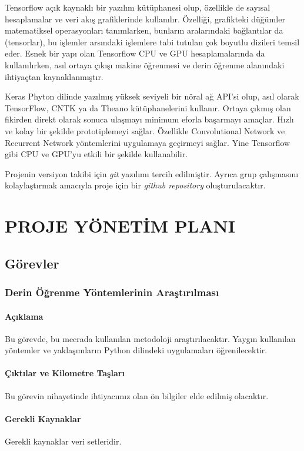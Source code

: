 \documentclass[12pt,a4paper]{article}
\begin{document}
   Tensorflow açık kaynaklı bir yazılım kütüphanesi olup, özellikle de sayısal hesaplamalar ve veri akış grafiklerinde kullanılır. Özelliği, grafikteki düğümler matematiksel operasyonları tanımlarken, bunların aralarındaki bağlantılar da (tensorlar), bu işlemler arsındaki işlemlere tabi tutulan çok boyutlu dizileri temsil eder.
   Esnek bir yapı olan Tensorflow CPU ve GPU hesaplamalarında da kullanılırken, asıl ortaya çıkışı makine öğrenmesi ve derin öğrenme alanındaki ihtiyaçtan kaynaklanmıştır. \cite{tf}

   Keras Phyton dilinde yazılmış yüksek seviyeli bir nöral ağ API'si olup, asıl olarak TensorFlow, CNTK ya da Theano kütüphanelerini kullanır. Ortaya çıkmış olan fikirden direkt olarak sonuca ulaşmayı minimum eforla başarmayı amaçlar. Hızlı ve kolay bir şekilde prototiplemeyi sağlar. Özellikle Convolutional Network ve Recurrent Network yöntemlerini uygulamaya geçirmeyi sağlar. Yine Tensorflow gibi CPU ve GPU'yu etkili bir şekilde kullanabilir. \cite{keras}
   
   Projenin versiyon takibi için \textit{git} yazılımı tercih edilmiştir. Ayrıca grup çalışmasını kolaylaştırmak amacıyla proje için bir \textit{github repository} oluşturulacaktır.

   \section{PROJE YÖNETİM PLANI}
   \subsection{Görevler}
   \subsubsection{Derin Öğrenme Yöntemlerinin Araştırılması}
   \paragraph{Açıklama}
   Bu görevde, bu mecrada kullanılan metodoloji araştırılacaktır. Yaygın kullanılan yöntemler ve yaklaşımların Python dilindeki uygulamaları öğrenilecektir.
   \paragraph{Çıktılar ve Kilometre Taşları}
   Bu görevin nihayetinde ihtiyacımız olan ön bilgiler elde edilmiş olacaktır.

   \paragraph{Gerekli Kaynaklar}
   Gerekli kaynaklar veri setleridir.
\end{document}
